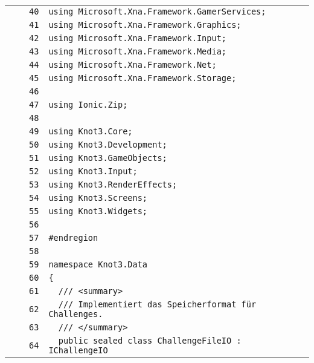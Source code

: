 \documentclass[a4paper,10pt]{article}
\begin{document}
\begin{longtable}[l]{lrrl}
\cellcolor{gray} &  & \verb~40~ & \verb~using Microsoft.Xna.Framework.GamerServices;~\\
\cellcolor{gray} &  & \verb~41~ & \verb~using Microsoft.Xna.Framework.Graphics;~\\
\cellcolor{gray} &  & \verb~42~ & \verb~using Microsoft.Xna.Framework.Input;~\\
\cellcolor{gray} &  & \verb~43~ & \verb~using Microsoft.Xna.Framework.Media;~\\
\cellcolor{gray} &  & \verb~44~ & \verb~using Microsoft.Xna.Framework.Net;~\\
\cellcolor{gray} &  & \verb~45~ & \verb~using Microsoft.Xna.Framework.Storage;~\\
\cellcolor{gray} &  & \verb~46~ & \verb~~\\
\cellcolor{gray} &  & \verb~47~ & \verb~using Ionic.Zip;~\\
\cellcolor{gray} &  & \verb~48~ & \verb~~\\
\cellcolor{gray} &  & \verb~49~ & \verb~using Knot3.Core;~\\
\cellcolor{gray} &  & \verb~50~ & \verb~using Knot3.Development;~\\
\cellcolor{gray} &  & \verb~51~ & \verb~using Knot3.GameObjects;~\\
\cellcolor{gray} &  & \verb~52~ & \verb~using Knot3.Input;~\\
\cellcolor{gray} &  & \verb~53~ & \verb~using Knot3.RenderEffects;~\\
\cellcolor{gray} &  & \verb~54~ & \verb~using Knot3.Screens;~\\
\cellcolor{gray} &  & \verb~55~ & \verb~using Knot3.Widgets;~\\
\cellcolor{gray} &  & \verb~56~ & \verb~~\\
\cellcolor{gray} &  & \verb~57~ & \verb~#endregion~\\
\cellcolor{gray} &  & \verb~58~ & \verb~~\\
\cellcolor{gray} &  & \verb~59~ & \verb~namespace Knot3.Data~\\
\cellcolor{gray} &  & \verb~60~ & \verb~{~\\
\cellcolor{gray} &  & \verb~61~ & \verb~  /// <summary>~\\
\cellcolor{gray} &  & \verb~62~ & \verb~  /// Implementiert das Speicherformat für Challenges.~\\
\cellcolor{gray} &  & \verb~63~ & \verb~  /// </summary>~\\
\cellcolor{gray} &  & \verb~64~ & \verb~  public sealed class ChallengeFileIO : IChallengeIO~\\

\end{longtable}
\end{document}
